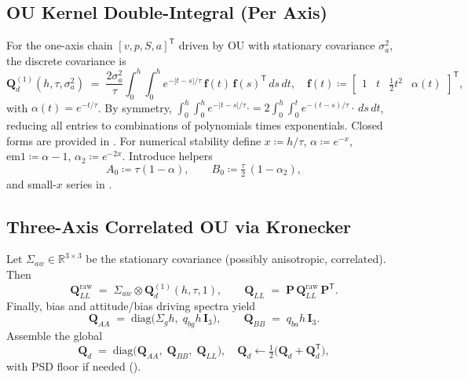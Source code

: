 \documentclass[11pt]{article}
\newcommand{\vect}[1]{\bm{#1}}
\newcommand{\mat}[1]{\bm{#1}}
\newcommand{\R}{\mathbb{R}}
\newcommand{\T}{\mathsf{T}}
\newcommand{\I}{\mat{I}}
\begin{document}
\subsection{OU Kernel Double-Integral (Per Axis)}
For the one-axis chain \( [v,p,S,a]^\T \) driven by OU with stationary covariance
\(\sigma_a^2\), the discrete covariance is
\begin{equation}
  \mat{Q}_d^{(1)}(h,\tau,\sigma_a^2) \;=\; \frac{2\sigma_a^2}{\tau}
  \int_0^h\!\!\int_0^h e^{-|t-s|/\tau}\,\vect{f}(t)\,\vect{f}(s)^{\T}\,ds\,dt,
  \quad
  \vect{f}(t) \coloneqq \begin{bmatrix} 1 & t & \tfrac12 t^2 & \alpha(t) \end{bmatrix}^{\T},
  \label{eq:Qd-axis-integral}
\end{equation}
with \(\alpha(t)=e^{-t/\tau}\). By symmetry,
\(\int_0^h\!\!\int_0^h e^{-|t-s|/\tau}\cdot = 2\int_0^h \int_0^t e^{-(t-s)/\tau}\cdot \,ds\,dt\),
reducing all entries to combinations of polynomials times exponentials.
Closed forms are provided in . For numerical stability define
\(x\coloneqq h/\tau\), \(\alpha\coloneqq e^{-x}\), \(\text{em1}\coloneqq \alpha-1\),
\(\alpha_2\coloneqq e^{-2x}\).
Introduce helpers
\begin{equation}
  A_0 \coloneqq \tau(1-\alpha),\qquad
  B_0 \coloneqq \tfrac{\tau}{2}\,(1-\alpha_2),
  \label{eq:A0B0}
\end{equation}
and small-\(x\) series in .

\subsection{Three-Axis Correlated OU via Kronecker}
Let \(\Sigma_{aw}\in\R^{3\times 3}\) be the stationary covariance (possibly anisotropic,
correlated). Then
\begin{equation}
  \mat{Q}_{LL}^{\mathrm{raw}}
  \;=\; \Sigma_{aw} \otimes \mat{Q}_d^{(1)}(h,\tau,1),
  \qquad
  \mat{Q}_{LL} \;=\; \mat{P}\,\mat{Q}_{LL}^{\mathrm{raw}}\,\mat{P}^{\T}.
  \label{eq:Qll-kron}
\end{equation}
Finally, bias and attitude/bias driving spectra yield
\begin{equation}
  \mat{Q}_{AA} \;=\; \mathrm{diag}\!\bigl(\Sigma_g h,\; q_{bg} h\,\I_3\bigr),
  \qquad
  \mat{Q}_{BB} \;=\; q_{ba} h\,\I_3.
  \label{eq:QaaQbb}
\end{equation}
Assemble the global
\begin{equation}
  \mat{Q}_d \;=\; \mathrm{diag}\!\bigl(\mat{Q}_{AA},\; \mat{Q}_{BB},\; \mat{Q}_{LL}\bigr),
  \quad
  \mat{Q}_d \gets \tfrac12\bigl(\mat{Q}_d+\mat{Q}_d^{\T}\bigr),
  \label{eq:Qd-full}
\end{equation}
with PSD floor if needed ().
\end{document}
